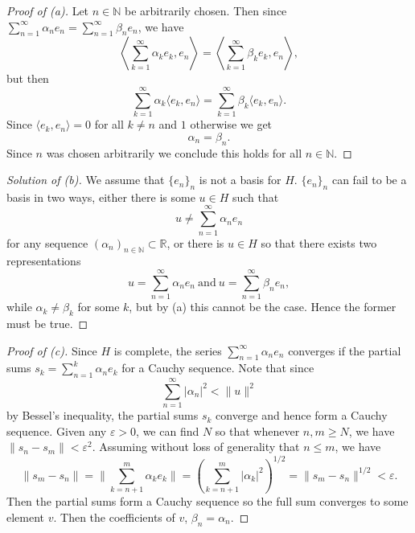 \begin{proof}[Proof of (a)]
    Let $n \in \mathbb N$ be arbitrarily chosen. Then 
    since $\sum_{n=1}^\infty \alpha_n e_n = \sum_{n=1}^\infty 
    \beta_n e_n$, we have 
    \[
        \left\langle \sum_{k=1}^\infty \alpha_k e_k, e_n 
            \right\rangle 
        = 
        \left\langle \sum_{k=1}^\infty \beta_k e_k, e_n 
            \right\rangle,
    \]
    but then 
    \[
        \sum_{k=1}^\infty \alpha_k \langle e_k, e_n \rangle 
        = 
        \sum_{k=1}^\infty \beta_k \langle e_k, e_n \rangle.  
    \]
    Since $\langle e_k, e_n\rangle = 0$ for all $k \neq n$ and 
    $1$ otherwise we get
    \[
        \alpha_n = \beta_n.
    \]
    Since $n$ was chosen arbitrarily we conclude this holds for 
    all $n \in \mathbb N$.
\end{proof}
\begin{proof}[Solution of (b)]
    We assume that $\{e_n\}_n$ is not a basis for $H$. 
    $\{e_n\}_n$ can fail to be a basis in two ways, either there 
    is some $u \in H$ such that 
    \[
        u \neq \sum_{n=1}^\infty \alpha_ne_n 
    \]
    for any sequence $(\alpha_n)_{n\in\mathbb N} \subset \mathbb R$,
    or there is $u \in H$ so that there exists two representations 
    \[
        u = \sum_{n=1}^\infty \alpha_n e_n \ \text{and} \ 
        u = \sum_{n=1}^\infty \beta_n e_n,
    \]
    while $\alpha_k \neq \beta_k$ for some $k$, but by (a) this 
    cannot be the case. Hence the former must be true. 
\end{proof}
\begin{proof}[Proof of (c)]
    Since $H$ is complete, the series $\sum_{n=1}^\infty \alpha_n 
    e_n$ converges if the partial sums $s_k = \sum_{n=1}^k \alpha_n 
    e_k$ for a Cauchy sequence. Note that since 
    \[
        \sum_{n=1}^\infty |\alpha_n|^2 < \|u\|^2
    \]
    by Bessel's inequality, the partial sums $s_k$ converge 
    and hence form a Cauchy sequence. Given any $\varepsilon > 0$, 
    we can find $N$ so that whenever $n,m \geq N$, we have 
    $\|s_n - s_m\| < \varepsilon^2$. Assuming without loss 
    of generality that $n \leq m$, we have 
    \[
        \|s_m - s_n\| = \|\sum_{k=n+1}^m \alpha_k e_k\| 
        = \left(\sum_{k=n+1}^m |\alpha_k|^2\right)^{1/2} 
        = \|s_m - s_n\|^{1/2} < \varepsilon.  
    \]
    Then the partial sums form a Cauchy sequence so 
    the full sum converges to some element $v$. Then 
    the coefficients of $v$, $\beta_n = \alpha_n$.
\end{proof}

